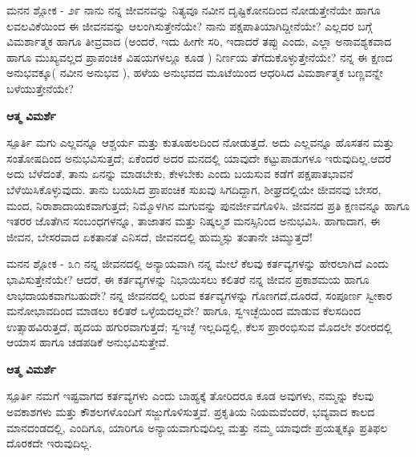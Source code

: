 \begin{mananam}{\mananamfont ಮನನ ಶ್ಲೋಕ - ೨೯}
\small \mananatext ನಾನು ನನ್ನ ಜೀವನವನ್ನು ನಿತ್ಯವೂ ನವೀನ ದೃಷ್ಟಿಕೋನದಿಂದ ನೋಡುತ್ತೇನೆಯೇ ಹಾಗೂ ಲವಲವಿಕೆಯಿಂದ ಈ ಜೀವನವನ್ನು ಆಲಂಗಿಸುತ್ತೇನೆಯೇ? ನಾನು ಪಕ್ಷಪಾತಿಯಾಗಿದ್ದೀನೆಯೇ? ಎಲ್ಲದರ ಬಗ್ಗೆ ವಿಮರ್ಶಾತ್ಮಕ ಹಾಗೂ ತೀವ್ರವಾದ (ಅಂದರೆ, ಇದು ಹೀಗೇ ಸರಿ, ಇದಾದರೆ ತಪ್ಪು ಎಂದು, ಎಲ್ಲಾ ಅನಾವಶ್ಯಕವಾದ ಹಾಗೂ ಮುಖ್ಯವಲ್ಲದ ಪ್ರಾಪಂಚಿಕ ವಿಷಯಗಳಲ್ಲೂ ಕೂಡ ) ನಿರ್ಣಯ ತೆಗೆದುಕೊಳ್ಳುತ್ತೇನೆಯೇ? ನನ್ನ ಈ ಕ್ಷಣದ ಅನುಭವಕ್ಕೂ( ನವೀನ ಅನುಭವ ), ಹಳೆಯ  ಅನುಭವದ ಮೂಟೆಯಿಂದ ಆಧರಿಸಿದ ವಿಮರ್ಶಾತ್ಮಕ ಬಣ್ಣವನ್ನೇ ಬಳೆಯುತ್ತೇನೆಯೇ?
\end{mananam}
\WritingHand\enspace\textbf{ಆತ್ಮ ವಿಮರ್ಶೆ}
\begin{inspiration}{\mananamfont ಸ್ಪೂರ್ತಿ}
\small \mananatext ಮಗು ಎಲ್ಲವನ್ನೂ ಆಶ್ಚರ್ಯ ಮತ್ತು ಕುತೂಹಲದಿಂದ ನೋಡುತ್ತದೆ. ಅದು ಎಲ್ಲವನ್ನೂ ಹೊಸತನ ಮತ್ತು ಸಂತೋಷದಿಂದ ಅನುಭವಿಸುತ್ತದೆ; ಏಕೆಂದರೆ ಅದರ ಮನದಲ್ಲಿ ಯಾವುದೇ ಕಟ್ಟುಪಾಡುಗಳೂ ಇರುವುದಿಲ್ಲ.ಆದರೆ ಅದು ಬೆಳೆದಂತೆ, ತಾನು ಏನನ್ನು ಮಾಡಬೇಕು, ಕೇಳಬೇಕು ಎಂದು ಬಯಸುವ ಕಡೆಗೆ ಪಕ್ಷಪಾತಭಾವನೆ ಬೆಳೆಯಿಸಿಕೊಳ್ಳುವುದು. ತಾನು ಬಯಸಿದ ಪ್ರಾಪಂಚಿಕ ಸುಖವು ಸಿಗದಿದ್ದಾಗ,  ಶೀಘ್ರದಲ್ಲಿಯೇ ಜೀವನವು ಬೇಸರ, ಮಂದ, ನಿರಾಶಾದಾಯಕವಾಗುತ್ತದೆ; ನಿಮ್ಮೊಳಗಿನ ಮಗುವನ್ನು ಪುನರ್ಜೀವಗೊಳಿಸಿ. ಜೀವನದ ಪ್ರತಿ ಕ್ಷಣವನ್ನೂ ಹಾಗೂ ಇತರರ ಜೊತೆಗಿನ ಸಂಬಂಧಗಳನ್ನೂ, ತಾಜಾತನ ಮತ್ತು ನಿಷ್ಕಲ್ಮಶ ಮನಸ್ಸಿನಿಂದ ಅನುಭವಿಸಿ. ಹಾಗಾದಾಗ, ಈ ಜೀವನ, ಬೇಸರವಾದ ಏಕತಾನತೆ ಎನಿಸದೆ, ಜೀವನದಲ್ಲಿ ಹುಮ್ಮಸ್ಸು ತಂತಾನೇ ಚಿಮ್ಮುತ್ತದೆ!
\end{inspiration}
\newpage

\begin{mananam}{\mananamfont ಮನನ ಶ್ಲೋಕ - ೩೧}
\small \mananatext ನನ್ನ ಜೀವನದಲ್ಲಿ ಅನ್ಯಾಯವಾಗಿ ನನ್ನ ಮೇಲೆ ಕೆಲವು ಕರ್ತವ್ಯಗಳನ್ನು ಹೇರಲಾಗಿದೆ ಎಂದು ಭಾವಿಸುತ್ತೇನೆಯೇ? ಆದರೆ, ಈ ಕರ್ತವ್ಯಗಳನ್ನು ನಿಭಾಯಿಸಲು ಕಲಿತರೆ ನನ್ನ ಜೀವನ ಪ್ರಕಾಶಮಯ ಹಾಗೂ ಲಾಭದಾಯಕವಾಗಬಹುದೇ? ನನ್ನ ಜೀವನದಲ್ಲಿ ಬರುವ ಕರ್ತವ್ಯಗಳನ್ನು ಗೊಣಗದೆ,ದೂರದೆ, ಸಂಪೂರ್ಣ ಸ್ವೀಕಾರ ಮನೋಭಾವದಿಂದ ಮಾಡಲು ಕಲಿತರೆ ಒಳ್ಳೆಯದಲ್ಲವೇ? ಹಾಗೂ, ಸ್ವಇಚ್ಛೆಯಿಂದ ಮಾಡುವ ಕೆಲಸದಿಂದ ಉತ್ಸಾಹವಿರುತ್ತದೆ, ಹೃದಯ ಹಗುರವಾಗುತ್ತದೆ; ಸ್ವಇಚ್ಛೆ ಇಲ್ಲದಿದ್ದಲ್ಲಿ, ಕೆಲಸ ಪ್ರಾರಂಭಿಸುವ  ಮೊದಲೇ ಶರೀರದಲ್ಲಿ ಆಯಾಸ ಹಾಗೂ ಚಡಪಡಿಕೆ ಅನುಭವಿಸುತ್ತೇವೆ. 
\end{mananam}
\WritingHand\enspace\textbf{ಆತ್ಮ ವಿಮರ್ಶೆ}
\begin{inspiration}{\mananamfont ಸ್ಪೂರ್ತಿ}
\small \mananatext ನಮಗೆ ಇಷ್ಟವಾಗದ ಕರ್ತವ್ಯಗಳು ಎಂದು ಬಾಹ್ಯಕ್ಕೆ ತೋರಿದರೂ ಕೂಡ ಅವುಗಳು,  ನಮ್ಮನ್ನು ಕೆಲವು ಅವಕಾಶಗಳು ಮತ್ತು ಕೌಶಲಗಳೊಂದಿಗೆ ಸಜ್ಜುಗೊಳಿಸುತ್ತವೆ. ಪ್ರಕೃತಿಯ ನಿಯಮವೆಂದರೆ, ಭವ್ಯವಾದ ಕಾಲದ ಮಾನದಂಡದಲ್ಲಿ,  ಎಂದಿಗೂ, ಯಾರಿಗೂ ಅನ್ಯಾಯವಾಗುವುದಿಲ್ಲ ಮತ್ತು ನಮ್ಮ ಯಾವುದೇ ಪ್ರಯತ್ನಕ್ಕೂ ಪ್ರತಿಫಲ ದೊರಕದೇ ಇರುವುದಿಲ್ಲ.
\end{inspiration}
\newpage


